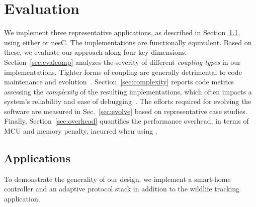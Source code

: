  \section{Evaluation}\label{sec:eval}

 We implement three representative applications, as described in
 Section~\ref{sec:scenarios}, using either \conesc or nesC. The
 implementations are functionally equivalent. Based on these, we
 evaluate our approach along four key
 dimensions. Section~\ref{sec:evalcomp} analyzes the severity of
 different \emph{coupling types} in our implementations. Tighter forms
 of coupling are generally detrimental to code maintenance and
 evolution~\cite{koopman10:better}. Section~\ref{sec:complexity}
 reports code metrics assessing the \emph{complexity} of the resulting
 implementations, which often impacts a system's reliability and ease
 of debugging~\cite{koopman10:better}. The efforts required for
 evolving the software are measured in Sec.~\ref{sec:evolve} based on
 representative case studies.  Finally, Section~\ref{sec:overhead}
 quantifies the performance overhead, in terms of MCU and memory
 penalty, incurred when using \conesc.



\subsection{Applications}\label{sec:scenarios}

To demonstrate the generality of our design, we implement a smart-home
controller and an adaptive protocol stack in addition to the wildlife
tracking application.

